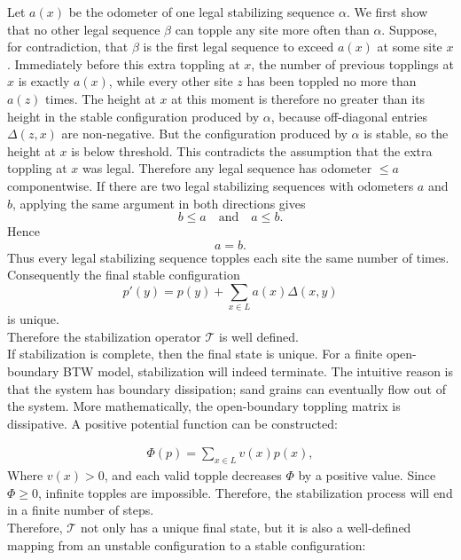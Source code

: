 \documentclass{article}
\begin{document}
Let \(a(x)\) be the odometer of one legal stabilizing sequence \(\alpha\). We first show that no other legal sequence \(\beta\) can topple any site more often than \(\alpha\). Suppose, for contradiction, that \(\beta\) is the first legal sequence to exceed \(a(x)\) at some site \(x\). Immediately before this extra toppling at \(x\), the number of previous topplings at \(x\) is exactly \(a(x)\), while every other site \(z\) has been toppled no more than \(a(z)\) times. The height at \(x\) at this moment is therefore no greater than its height in the stable configuration produced by \(\alpha\), because off-diagonal entries \(\Delta(z,x)\) are non-negative. But the configuration produced by \(\alpha\) is stable, so the height at \(x\) is below threshold. This contradicts the assumption that the extra toppling at \(x\) was legal. Therefore any legal sequence has odometer \(\le a\) componentwise. If there are two legal stabilizing sequences with odometers \(a\) and \(b\), applying the same argument in both directions gives
\[
b\le a
\quad\text{and}\quad
 a\le b.
\]
Hence
\[
a=b.
\]
Thus every legal stabilizing sequence topples each site the same number of times. Consequently the final stable configuration
\[
p'(y)=p(y)+\sum_{x\in L}a(x)\Delta(x,y)
\]
is unique.\\

Therefore the stabilization operator \(\mathcal{T}\) is well defined.\\

If stabilization is complete, then the final state is unique. For a finite open-boundary BTW model, stabilization will indeed terminate. The intuitive reason is that the system has boundary dissipation; sand grains can eventually flow out of the system. More mathematically, the open-boundary toppling matrix is dissipative. A positive potential function can be constructed:

\begin{align}
\Phi(p) = \sum_{x \in L} v(x)p(x),
\end{align}
Where $v(x) > 0$, and each valid topple decreases $\Phi$ by a positive value. Since $\Phi \geq 0$, infinite topples are impossible. Therefore, the stabilization process will end in a finite number of steps.\\

Therefore, $\mathcal{T}$ not only has a unique final state, but it is also a well-defined mapping from an unstable configuration to a stable configuration:

\clearpage
\end{document}
